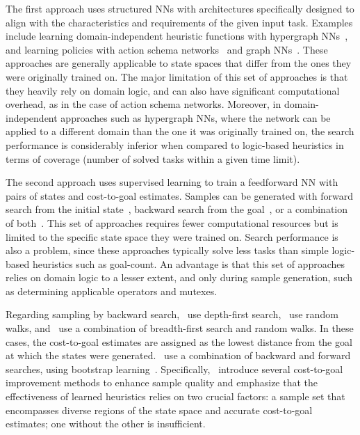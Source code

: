 \documentclass[ppgc,diss,english]{iiufrgs}
\begin{document}
The first approach uses structured NNs with architectures specifically designed to align with the characteristics and requirements of the given input task. Examples include learning domain-independent heuristic functions with hypergraph NNs~\cite{Shen.etal/2020}, and learning policies with action schema networks~\cite{Toyer.etal/2018,Toyer.etal/2020} and graph NNs~\cite{Stahlberg.etal/2022}. These approaches are generally applicable to state spaces that differ from the ones they were originally trained on. The major limitation of this set of approaches is that they heavily rely on domain logic, and can also have significant computational overhead, as in the case of action schema networks. Moreover, in domain-independent approaches such as hypergraph NNs, where the network can be applied to a different domain than the one it was originally trained on, the search performance is considerably inferior when compared to logic-based heuristics in terms of coverage (number of solved tasks within a given time limit).

The second approach uses supervised learning to train a feedforward NN with pairs of states and cost-to-goal estimates. Samples can be generated with forward search from the initial state~\cite{Ferber.etal/2020a}, backward search from the goal~\cite{Yu.etal/2020,OToole/2022,Bettker.etal/2022}, or a combination of both~\cite{Ferber.etal/2022}.
This set of approaches requires fewer computational resources but is limited to the specific state space they were trained on. Search performance is also a problem, since these approaches typically solve less tasks than simple logic-based heuristics such as goal-count. An advantage is that this set of approaches relies on domain logic to a lesser extent, and only during sample generation, such as determining applicable operators and mutexes.

Regarding sampling by backward search,~\citet{Yu.etal/2020} use depth-first search,~\citet{OToole/2022} use random walks, and~\citet{Bettker.etal/2022} use a combination of breadth-first search and random walks. In these cases, the cost-to-goal estimates are assigned as the lowest distance from the goal at which the states were generated.~\citet{Ferber.etal/2022} use a combination of backward and forward searches, using bootstrap learning~\cite{Arfaee.etal/2011}.
Specifically,~\citet{Bettker.etal/2022} introduce several cost-to-goal improvement methods to enhance sample quality and emphasize that the effectiveness of learned heuristics relies on two crucial factors: a sample set that encompasses diverse regions of the state space and accurate cost-to-goal estimates; one without the other is insufficient.
\end{document}
